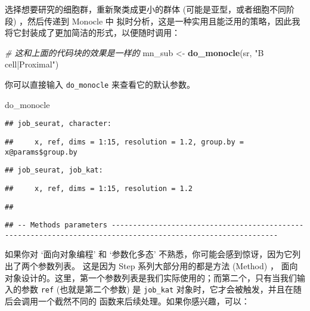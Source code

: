 \documentclass[
]{article}
\newenvironment{Shaded}{\begin{snugshade}}{\end{snugshade}}
\newcommand{\CommentTok}[1]{\textcolor[rgb]{0.56,0.35,0.01}{\textit{#1}}}
\newcommand{\KeywordTok}[1]{\textcolor[rgb]{0.13,0.29,0.53}{\textbf{#1}}}
\newcommand{\NormalTok}[1]{#1}
\newcommand{\StringTok}[1]{\textcolor[rgb]{0.31,0.60,0.02}{#1}}
\begin{document}
选择想要研究的细胞群，重新聚类成更小的群体 (可能是亚型，或者细胞不同阶段) ，然后传递到 Monocle 中
拟时分析，这是一种实用且能泛用的策略，因此我将它封装成了更加简洁的形式，以便随时调用：

\begin{Shaded}
\begin{Highlighting}[]
\CommentTok{\# 这和上面的代码块的效果是一样的}
\NormalTok{mn\_sub \textless{}{-}}\StringTok{ }\KeywordTok{do\_monocle}\NormalTok{(sr, }\StringTok{"B cell|Proximal"}\NormalTok{)}
\end{Highlighting}
\end{Shaded}

你可以直接输入 \texttt{do\_monocle} 来查看它的默认参数。

\begin{Shaded}
\begin{Highlighting}[]
\NormalTok{do\_monocle}
\end{Highlighting}
\end{Shaded}

\begin{verbatim}
## job_seurat, character:
\end{verbatim}

\begin{verbatim}
##     x, ref, dims = 1:15, resolution = 1.2, group.by = x@params$group.by
\end{verbatim}

\begin{verbatim}
## job_seurat, job_kat:
\end{verbatim}

\begin{verbatim}
##     x, ref, dims = 1:15, resolution = 1.2
\end{verbatim}

\begin{verbatim}
## 
\end{verbatim}

\begin{verbatim}
## -- Methods parameters -------------------------------------------------------------------------------------------------------------
\end{verbatim}

如果你对 `面向对象编程' 和 `参数化多态' 不熟悉，你可能会感到惊讶，因为它列出了两个参数列表。
这是因为 Step 系列大部分用的都是方法 (Method) ，
面向对象设计的。这里，第一个参数列表是我们实际使用的；而第二个，只有当我们输入的参数 \texttt{ref}
(也就是第二个参数) 是 \texttt{job\_kat} 对象时，它才会被触发，并且在随后会调用一个截然不同的
函数来后续处理。如果你感兴趣，可以：
\end{document}
